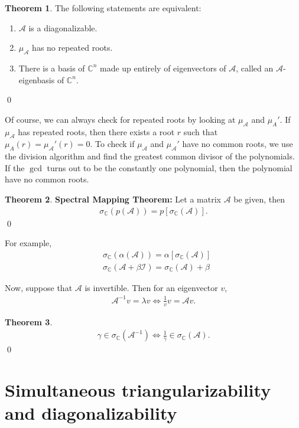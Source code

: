 \documentclass{book}
\theoremstyle{definition}
\newtheorem{thm}{Theorem}[section]
\newcommand{\C}{\mathbb{C}}
\newcommand{\A}{\mathcal{A}}
\begin{document}
\begin{thm}
	The following statements are equivalent:
	\begin{enumerate}
		\item $\A$ is a diagonalizable. 
		\item $\mu_\A$ has no repeated roots.
		\item There is a basis of $\C^n$ made up entirely of eigenvectors of $\A$, called an $\A$-eigenbasis of $\C^n$.
	\end{enumerate} \qed
\end{thm}

Of course, we can always check for repeated roots by looking at $\mu_\A$ and $\mu_A'$. If $\mu_\A$ has repeated roots, then there exists a root $r$ such that $\mu_A(r) = \mu_\A'(r) = 0$. To check if $\mu_\A$ and $\mu_\A'$ have no common roots, we use the division algorithm and find the greatest common divisor of the polynomials. If the $\gcd$ turns out to be the constantly one polynomial, then the polynomial have no common roots. 

\begin{thm}
	\textbf{Spectral Mapping Theorem:} Let a matrix $\A$ be given, then
	\begin{align*}
	\sigma_\C(p(\A)) = p \left[ \sigma_\C(\A)\right].
	\end{align*}\qed
\end{thm}


For example,
\begin{align*}
&\sigma_\C(\alpha(\A)) = \alpha \left[\sigma_\C(\A)\right]\\
&\sigma_\C(\A + \beta\mathcal{I}) = \sigma_\C(\A) + \beta
\end{align*}

Now, suppose that $\A$ is invertible. Then for an eigenvector $v$,
\begin{align*}
\A^{-1}v = \lambda v \iff \frac{1}{v}v = \A v.
\end{align*}

\begin{thm}
	\begin{align*}
	\gamma \in \sigma_\C(\A^{-1}) \iff \frac{1}{\gamma} \in \sigma_\C(\A).
	\end{align*}\qed
\end{thm}



\section{Simultaneous triangularizability and diagonalizability}
\end{document}

